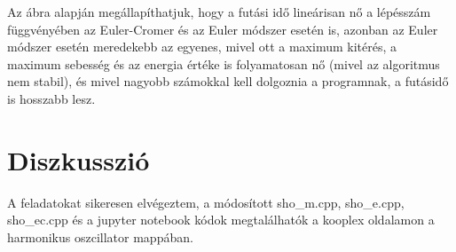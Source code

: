 \documentclass[a4paper,12pt]{article}
\begin{document}
Az ábra alapján megállapíthatjuk, hogy a futási idő lineárisan nő a lépésszám függvényében az Euler-Cromer és az Euler módszer esetén is, azonban az Euler módszer esetén meredekebb az egyenes, mivel ott a maximum kitérés, a maximum sebesség és az energia értéke is folyamatosan nő (mivel az algoritmus nem stabil), és mivel nagyobb számokkal kell dolgoznia a programnak, a futásidő is hosszabb lesz.

\section{Diszkusszió}

A feladatokat sikeresen elvégeztem, a módosított sho\_m.cpp, sho\_e.cpp, sho\_ec.cpp és a jupyter notebook kódok megtalálhatók a kooplex oldalamon a harmonikus oszcillator mappában.

%
\end{document}
